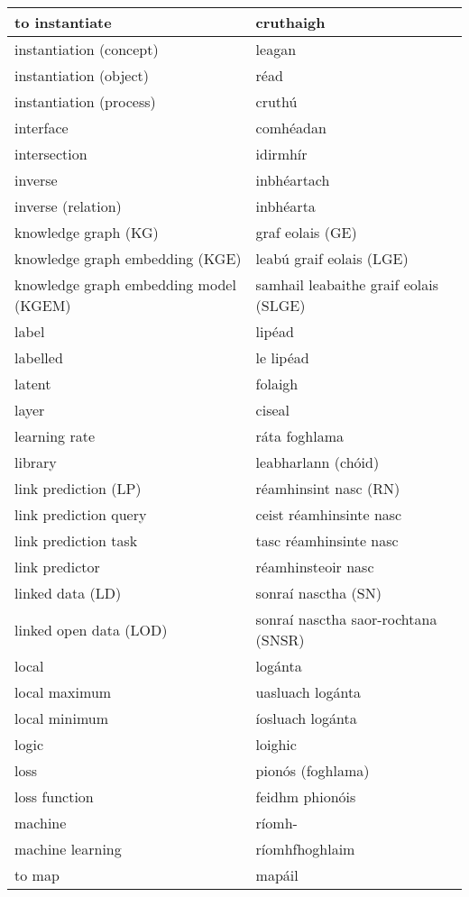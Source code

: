 \begin{longtable}{|l|l|}
		to instantiate&cruthaigh\\ \hline 
		instantiation (concept)&leagan\\ \hline 
		instantiation (object)&réad\\ \hline 
		instantiation (process)&cruthú\\ \hline 
		interface&comhéadan\\ \hline 
		intersection&idirmhír\\ \hline 
		inverse&inbhéartach\\ \hline 
		inverse (relation)&inbhéarta\\ \hline 
		knowledge graph (KG)&graf eolais (GE)\\ \hline 
		knowledge graph embedding (KGE)&leabú graif eolais (LGE)\\ \hline 
		knowledge graph embedding model (KGEM)&samhail leabaithe graif eolais (SLGE)\\ \hline 
		label&lipéad\\ \hline 
		labelled&le lipéad\\ \hline 
		latent&folaigh\\ \hline 
		layer&ciseal\\ \hline 
		learning rate&ráta foghlama\\ \hline 
		library&leabharlann (chóid)\\ \hline 
		link prediction (LP)&réamhinsint nasc (RN)\\ \hline 
		link prediction query&ceist réamhinsinte nasc\\ \hline 
		link prediction task&tasc réamhinsinte nasc\\ \hline 
		link predictor&réamhinsteoir nasc\\ \hline 
		linked data (LD)&sonraí nasctha (SN)\\ \hline 
		linked open data (LOD)&sonraí nasctha saor-rochtana (SNSR)\\ \hline 
		local&logánta\\ \hline 
		local maximum&uasluach logánta\\ \hline 
		local minimum&íosluach logánta\\ \hline 
		logic&loighic\\ \hline 
		loss&pionós (foghlama)\\ \hline 
		loss function&feidhm phionóis\\ \hline 
		machine&ríomh-\\ \hline 
		machine learning&ríomhfhoghlaim\\ \hline 
		to map&mapáil\\ \hline 

\end{longtable}
